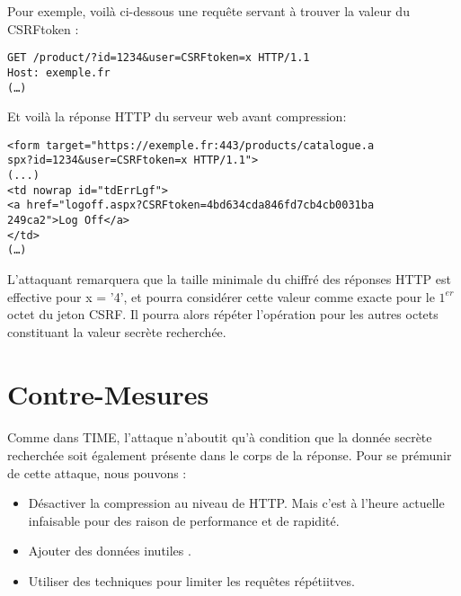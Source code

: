 Pour exemple, voilà ci-dessous une requête servant à trouver la valeur du CSRFtoken :

\begin{verbatim}
GET /product/?id=1234&user=CSRFtoken=x HTTP/1.1
Host: exemple.fr
(…)
\end{verbatim}

Et voilà la réponse HTTP du serveur web avant compression:

\begin{verbatim}
<form target="https://exemple.fr:443/products/catalogue.a
spx?id=1234&user=CSRFtoken=x HTTP/1.1">
(...)
<td nowrap id="tdErrLgf">
<a href="logoff.aspx?CSRFtoken=4bd634cda846fd7cb4cb0031ba
249ca2">Log Off</a>
</td>
(…)
\end{verbatim}

L'attaquant remarquera que la taille minimale du chiffré des réponses HTTP est effective pour x = '4', et pourra considérer cette valeur comme exacte pour le $1^{er}$ octet du jeton CSRF. Il pourra alors répéter l'opération pour les autres octets constituant la valeur secrète recherchée.

\section{Contre-Mesures}
\paragraph{}
Comme dans TIME, l'attaque n'aboutit qu'à condition que la donnée secrète recherchée soit également présente dans le corps de la réponse. Pour se prémunir de cette attaque, nous pouvons :

\begin{itemize}
  \item Désactiver la compression au niveau de HTTP. Mais c'est à l'heure actuelle infaisable pour des raison de performance et de rapidité. 
  \item Ajouter des données inutiles .
  \item Utiliser des techniques pour limiter les requêtes répétiitves.
\end{itemize}

